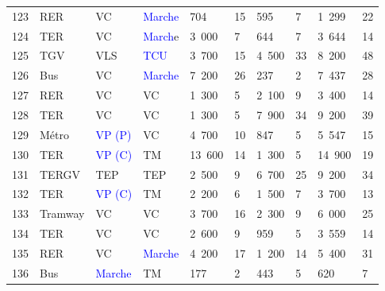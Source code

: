 \begin{longtable}{p{0.7cm}p{1.4cm}p{1.4cm}p{1.6cm}p{0.8cm}p{0.8cm}p{0.8cm}p{0.8cm}p{1.1cm}p{1.1cm}}
    \small{123} & \small{RER} & \small{VC} & \small{\textcolor{blue}{Marche}} & \small{704} & \small{15} & \small{595} & \small{7} & \small{1~299} & \small{22}\\
    \small{124} & \small{TER} & \small{VC} & \small{\textcolor{blue}{March}e} & \small{3~000} & \small{7} & \small{644} & \small{7} & \small{3~644} & \small{14}\\
    \small{125} & \small{TGV} & \small{VLS} & \small\textcolor{blue}{{TCU}} & \small{3~700} & \small{15} & \small{4~500} & \small{33} & \small{8~200} & \small{48}\\
    \small{126} & \small{Bus} & \small{VC} & \small{\textcolor{blue}{Marche}} & \small{7~200} & \small{26} & \small{237} & \small{2} & \small{7~437} & \small{28}\\
    \small{127} & \small{RER} & \small{VC} & \small{VC} & \small{1~300} & \small{5} & \small{2~100} & \small{9} & \small{3~400} & \small{14}\\
    \small{128} & \small{TER} & \small{VC} & \small{VC} & \small{1~300} & \small{5} & \small{7~900} & \small{34} & \small{9~200} & \small{39}\\
    \small{129} & \small{Métro} & \small{\textcolor{blue}{VP (P)}} & \small{VC} & \small{4~700} & \small{10} & \small{847} & \small{5} & \small{5~547} & \small{15}\\
    \small{130} & \small{TER} & \small{\textcolor{blue}{VP (C)}} & \small{TM} & \small{13~600} & \small{14} & \small{1~300} & \small{5} & \small{14~900} & \small{19}\\
    \small{131} & \small{TERGV} & \small{TEP} & \small{TEP} & \small{2~500} & \small{9} & \small{6~700} & \small{25} & \small{9~200} & \small{34}\\
    \small{132} & \small{TER} & \small{\textcolor{blue}{VP (C)}} & \small{TM} & \small{2~200} & \small{6} & \small{1~500} & \small{7} & \small{3~700} & \small{13}\\
    \small{133} & \small{Tramway} & \small{VC} & \small{VC} & \small{3~700} & \small{16} & \small{2~300} & \small{9} & \small{6~000} & \small{25}\\
    \small{134} & \small{TER} & \small{VC} & \small{VC} & \small{2~600} & \small{9} & \small{959} & \small{5} & \small{3~559} & \small{14}\\
    \small{135} & \small{RER} & \small{VC} & \small{\textcolor{blue}{Marche}} & \small{4~200} & \small{17} & \small{1~200} & \small{14} & \small{5~400} & \small{31}\\
    \small{136} & \small{Bus} & \small{\textcolor{blue}{Marche}} & \small{TM} & \small{177} & \small{2} & \small{443} & \small{5} & \small{620} & \small{7}\\

\end{longtable}
